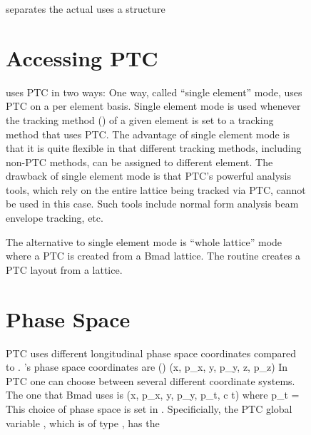 \begin{figure}
{separates the actual uses
a  structure

\section{Accessing PTC}
\label{s:ptc.access}

\bmad uses PTC in two ways: One way, called ``single element'' mode,
uses PTC on a per element basis. Single element mode is used whenever
the tracking method () of a given element is set to a
tracking method that uses PTC. The advantage of single element mode is
that it is quite flexible in that different tracking methods,
including non-PTC methods, can be assigned to different element. The
drawback of single element mode is that PTC's powerful analysis tools,
which rely on the entire lattice being tracked via PTC, cannot be used
in this case. Such tools include normal form analysis beam envelope
tracking, etc.

The alternative to single element mode is ``whole lattice'' mode where
a PTC  is created from a Bmad lattice. The routine
 creates a PTC layout from a \bmad lattice.

\section{Phase Space}
\label{s:etienne.space}

PTC uses different longitudinal phase space coordinates compared to \bmad.
\bmad's phase space coordinates are ()
\Begineq
  (x, p_x, y, p_y, z, p_z)
\Endeq
In PTC one can choose between several different coordinate systems. The one
that Bmad uses is 
\Begineq
  (x, p_x, y, p_y, p_t, c \Delta t)
\Endeq
where
\Begineq
  p_t = 
\Endeq
This choice of phase space is set in .  Specificially,
the PTC global variable , which is of type
, has the \vn{%

\vn{vec_bmad_to_ptc} and \vn{vec_ptc_to_bmad} are conversion routines
that translate between the two. Actually there are a number of
conversion routines that translate between \bmad and PTC
structures. See \sref{r:ptc} for more details.

}}
\end{figure}
